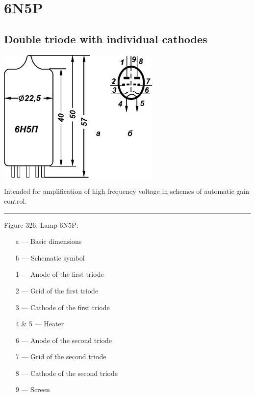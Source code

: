 \documentclass[12pt]{article}
\begin{document}
    \section*{6N5P}
    \subsection*{Double triode with individual cathodes}
    
    \par
    \begin{minipage}[b][0mm][t]{0.45\textwidth}
        \includegraphics[width=80mm]{symbol.png}
    \end{minipage}
    \begin{minipage}[b][0mm][t]{0.45\textwidth}
        \begin{raggedright}
            \quad Intended for amplification of high frequency voltage in schemes of automatic gain control.
            \vspace{2mm}
            \hrule
            \vspace{2mm}
            Figure 326, Lamp 6N5P:
            \vspace{-4mm}
            \begin{itemize} \setlength \itemsep{-2.25mm}
                \item[a] --- Basic dimensions
                \item[b] --- Schematic symbol
                \item[1] --- Anode of the first triode
                \item[2] --- Grid of the first triode
                \item[3] --- Cathode of the first triode
                \item[4 \& 5] --- Heater
                \item[6] --- Anode of the second triode
                \item[7] --- Grid of the second triode
                \item[8] --- Cathode of the second triode
                \item[9] --- Screen
            \end{itemize}
        \end{raggedright}
    \end{minipage}
    
\end{document}
